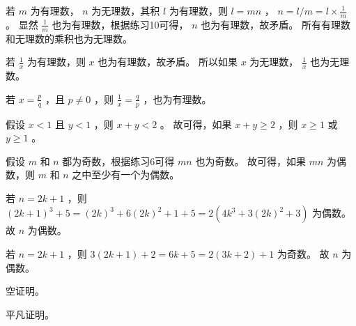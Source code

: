 {{        %
        \begin{practices}
            若 $m$ 为有理数， $n$ 为无理数，其积 $l$ 为有理数，则 $l = mn$ ， $n = l / m = l \times \frac{1}{m}$ 。
            显然 $\frac{1}{m}$ 也为有理数，根据练习10可得， $n$ 也为有理数，故矛盾。
            所有有理数和无理数的乘积也为无理数。
        \end{practices}

        \begin{practices}
            若 $\frac{1}{x}$ 为有理数，则 $x$ 也为有理数，故矛盾。
            所以如果 $x$ 为无理数， $\frac{1}{x}$ 也为无理数。
        \end{practices}

        \begin{practices}
            若 $x = \frac{p}{q}$ ，且 $p \neq 0$ ，则 $\frac{1}{x} = \frac{q}{p}$ ，也为有理数。
        \end{practices}

        \begin{practices}
            假设 $x < 1$ 且 $y < 1$ ，则 $x + y < 2$ 。
            故可得，如果 $x + y \geq 2$ ，则 $x \geq 1$ 或 $y \geq 1$ 。
        \end{practices}

        \begin{practices}
            假设 $m$ 和 $n$ 都为奇数，根据练习6可得 $mn$ 也为奇数。
            故可得，如果 $mn$ 为偶数，则 $m$ 和 $n$ 之中至少有一个为偶数。
        \end{practices}

        \begin{practices}
            若 $n = 2k + 1$ ，则 $(2k + 1)^3 + 5 = (2k)^3 + 6(2k)^2 + 1 + 5 = 2(4k^3 + 3(2k)^2 + 3)$ 为偶数。
            故 $n$ 为偶数。
        \end{practices}

        \begin{practices}
            若 $n = 2k + 1$ ，则 $3(2k + 1) +2 = 6k + 5 = 2(3k + 2) + 1$ 为奇数。
            故 $n$ 为偶数。 
        \end{practices}

        \begin{practices}
            空证明。
        \end{practices}

        \begin{practices}
            平凡证明。
        \end{practices}

}}
